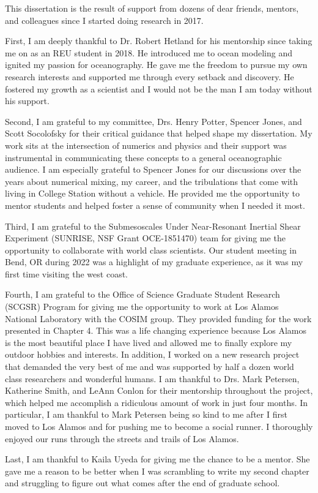 
\begin{acknowledgements}
This dissertation is the result of support from dozens of dear friends, mentors, and colleagues since I started doing research in 2017.

First, I am deeply thankful to Dr. Robert Hetland for his mentorship since taking me on as an REU student in 2018. He introduced me to ocean modeling and ignited my passion for oceanography. He gave me the freedom to pursue my own research interests and supported me through every setback and discovery. He fostered my growth as a scientist and I would not be the man I am today without his support. 

Second, I am grateful to my committee, Drs. Henry Potter, Spencer Jones, and Scott Socolofsky for their critical guidance that helped shape my dissertation. My work sits at the intersection of numerics and physics and their support was instrumental in communicating these concepts to a general oceanographic audience. I am especially grateful to Spencer Jones for our discussions over the years about numerical mixing, my career, and the tribulations that come with living in College Station without a vehicle. He provided me the opportunity to mentor students and helped foster a sense of community when I needed it most. 

Third, I am grateful to the Submesoscales Under Near-Resonant Inertial Shear Experiment (SUNRISE, NSF Grant OCE-1851470) team for giving me the opportunity to collaborate with world class scientists. Our student meeting in Bend, OR during 2022 was a highlight of my graduate experience, as it was my first time visiting the west coast. 

Fourth, I am grateful to the Office of Science Graduate Student Research (SCGSR) Program for giving me the opportunity to work at Los Alamos National Laboratory with the COSIM group. They provided funding for the work presented in Chapter 4. This was a life changing experience because Los Alamos is the most beautiful place I have lived and allowed me to finally explore my outdoor hobbies and interests. In addition, I worked on a new research project that demanded the very best of me and was supported by half a dozen world class researchers and wonderful humans. I am thankful to Drs. Mark Petersen, Katherine Smith, and LeAnn Conlon for their mentorship throughout the project, which helped me accomplish a ridiculous amount of work in just four months. In particular, I am thankful to Mark Petersen being so kind to me after I first moved to Los Alamos and for pushing me to become a social runner. I thoroughly enjoyed our runs through the streets and trails of Los Alamos. 

Last, I am thankful to Kaila Uyeda for giving me the chance to be a mentor. She gave me a reason to be better when I was scrambling to write my second chapter and struggling to figure out what comes after the end of graduate school. 



\end{acknowledgements}